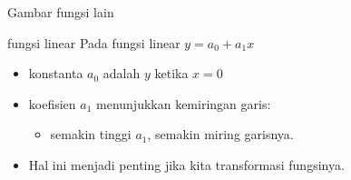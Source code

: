 \documentclass[
  ignorenonframetext,
]{beamer}
\providecommand{\tightlist}{%
  \setlength{\itemsep}{0pt}\setlength{\parskip}{0pt}}\usepackage{longtable,booktabs,array}
\begin{document}
\begin{frame}{Gambar fungsi lain}
\begin{figure}
\begin{minipage}{0.33\linewidth}
\begin{figure}[H]
{}


\end{figure}%

\end{minipage}%

\end{figure}%
\end{frame}

\begin{frame}{fungsi linear}
\label{fungsi-linear-1}
Pada fungsi linear \(y=a_0+a_1x\)

\begin{itemize}
\item
  konstanta \(a_0\) adalah \(y\) ketika \(x=0\)
\item
  koefisien \(a_1\) menunjukkan kemiringan garis:

  \begin{itemize}
  \tightlist
  \item
    semakin tinggi \(a_1\), semakin miring garisnya.
  \end{itemize}
\item
  Hal ini menjadi penting jika kita transformasi fungsinya.
\end{itemize}
\end{frame}
\end{document}
